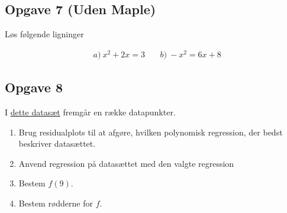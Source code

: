 \subsection*{Opgave 7 (Uden Maple)}

Løs følgende ligninger

\begin{align*}
	&a) \ x^2 + 2x = 3 \ &&b) \ -x^2 = 6x + 8 
\end{align*}

\subsection*{Opgave 8}

I \href{https://github.com/ChristianJLex/TeachingNotes/raw/master/2023-2024/Data og lign/Polynomisk.xlsx}{\color{blue!60} dette datasæt} fremgår en række datapunkter.
\begin{enumerate}[label=\roman*)]
	\item Brug residualplots til at afgøre, hvilken polynomisk regression, der bedst beskriver 
	datasættet.
	\item Anvend regression på datasættet med den valgte regression
	\item Bestem $f(9)$.
	\item Bestem rødderne for $f$. 
\end{enumerate}